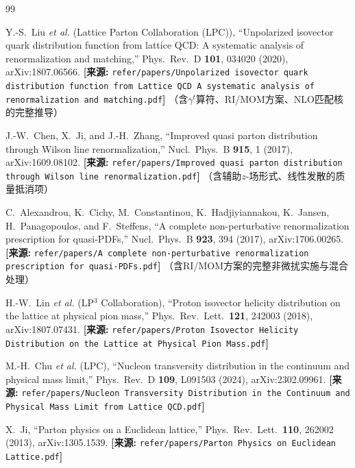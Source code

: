 \documentclass[12pt,a4paper]{ctexart}
\theoremstyle{definition}
\begin{document}
\begin{thebibliography}{99}

Y.-S.~Liu \textit{et al.} (Lattice Parton Collaboration (LPC)),
``Unpolarized isovector quark distribution function from lattice QCD: A systematic analysis of renormalization and matching,''
Phys.\ Rev.\ D \textbf{101}, 034020 (2020), arXiv:1807.06566.
\quad\textbf{[来源:} \texttt{refer/papers/Unpolarized isovector quark distribution function from Lattice QCD A systematic analysis of renormalization and matching.pdf}\textbf{]}
（含$\gamma^t$算符、RI/MOM方案、NLO匹配核的完整推导）

J.-W.~Chen, X.~Ji, and J.-H.~Zhang,
``Improved quasi parton distribution through Wilson line renormalization,''
Nucl.\ Phys.\ B \textbf{915}, 1 (2017), arXiv:1609.08102.
\quad\textbf{[来源:} \texttt{refer/papers/Improved quasi parton distribution through Wilson line renormalization.pdf}\textbf{]}
（含辅助$z$-场形式、线性发散的质量抵消项）

C.~Alexandrou, K.~Cichy, M.~Constantinou, K.~Hadjiyiannakou, K.~Jansen, H.~Panagopoulos, and F.~Steffens,
``A complete non-perturbative renormalization prescription for quasi-PDFs,''
Nucl.\ Phys.\ B \textbf{923}, 394 (2017), arXiv:1706.00265.
\quad\textbf{[来源:} \texttt{refer/papers/A complete non-perturbative renormalization prescription for quasi-PDFs.pdf}\textbf{]}
（含RI/MOM方案的完整非微扰实施与混合处理）

H.-W.~Lin \textit{et al.} (LP$^3$ Collaboration),
``Proton isovector helicity distribution on the lattice at physical pion mass,''
Phys.\ Rev.\ Lett.\ \textbf{121}, 242003 (2018), arXiv:1807.07431.
\quad\textbf{[来源:} \texttt{refer/papers/Proton Isovector Helicity Distribution on the Lattice at Physical Pion Mass.pdf}\textbf{]}

M.-H.~Chu \textit{et al.} (LPC),
``Nucleon transversity distribution in the continuum and physical mass limit,''
Phys.\ Rev.\ D \textbf{109}, L091503 (2024), arXiv:2302.09961.
\quad\textbf{[来源:} \texttt{refer/papers/Nucleon Transversity Distribution in the Continuum and Physical Mass Limit from Lattice QCD.pdf}\textbf{]}

X.~Ji,
``Parton physics on a Euclidean lattice,''
Phys.\ Rev.\ Lett.\ \textbf{110}, 262002 (2013), arXiv:1305.1539.
\quad\textbf{[来源:} \texttt{refer/papers/Parton Physics on Euclidean Lattice.pdf}\textbf{]}


\end{thebibliography}
\end{document}
